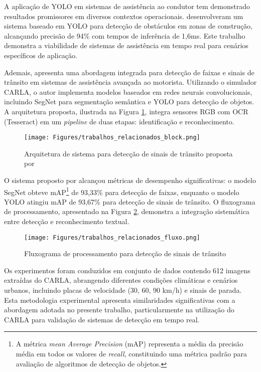 A aplicação de YOLO em sistemas de assistência ao condutor tem demonstrado resultados promissores em diversos contextos operacionais.  desenvolveram um sistema baseado em YOLO para detecção de obstáculos em zonas de construção, alcançando precisão de 94\% com tempos de inferência de 1,6ms. Este trabalho demonstra a viabilidade de sistemas de assistência em tempo real para cenários específicos de aplicação.

Ademais,  apresenta uma abordagem integrada para detecção de faixas e sinais de trânsito em sistemas de assistência avançada ao motorista. Utilizando o simulador CARLA, o autor implementa modelos baseados em redes neurais convolucionais, incluindo SegNet para segmentação semântica e YOLO para detecção de objetos. A arquitetura proposta, ilustrada na Figura \ref{trabalhos_relacionados_block}, integra sensores RGB com OCR (Tesseract) em um \textit{pipeline} de duas etapas: identificação e reconhecimento.

\begin{figure}[H]
\centering
\texttt{[image: Figures/trabalhos\_relacionados\_block.png]}
\caption{Arquitetura de sistema para detecção de sinais de trânsito proposta por }
\label{trabalhos_relacionados_block}
\end{figure}

O sistema proposto por  alcançou métricas de desempenho significativas: o modelo SegNet obteve mAP\footnote{A métrica \textit{mean Average Precision} (mAP) representa a média da precisão média em todos os valores de \textit{recall}, constituindo uma métrica padrão para avaliação de algoritmos de detecção de objetos.} de 93,33\% para detecção de faixas, enquanto o modelo YOLO atingiu mAP de 93,67\% para detecção de sinais de trânsito. O fluxograma de processamento, apresentado na Figura \ref{trabalhos_relacionados_fluxo}, demonstra a integração sistemática entre detecção e reconhecimento textual.

\begin{figure}[H]
\centering
\texttt{[image: Figures/trabalhos\_relacionados\_fluxo.png]}
\caption{Fluxograma de processamento para detecção de sinais de trânsito \cite[p. ~2065]{W4389342036}}
\label{trabalhos_relacionados_fluxo}
\end{figure}

Os experimentos foram conduzidos em conjunto de dados contendo 612 imagens extraídas do CARLA, abrangendo diferentes condições climáticas e cenários urbanos, incluindo placas de velocidade (30, 60, 90 km/h) e sinais de parada. Esta metodologia experimental apresenta similaridades significativas com a abordagem adotada no presente trabalho, particularmente na utilização do CARLA para validação de sistemas de detecção em tempo real.

